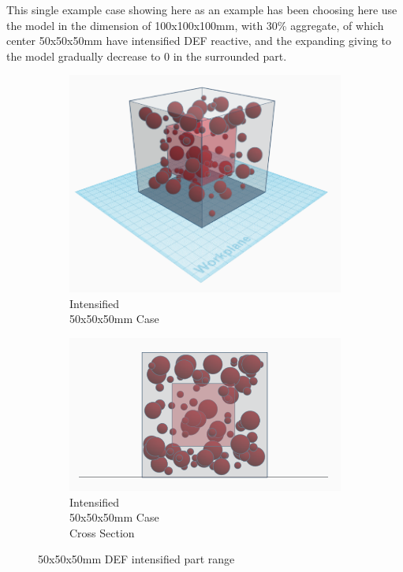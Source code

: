This single example case showing here as an example has been choosing here use the model in the dimension of 100x100x100mm, with 30\% aggregate, of which center 50x50x50mm have intensified DEF reactive, and the expanding giving to the model gradually decrease to 0 in the surrounded part.

\begin{figure}[ht]
\centering
    \begin{subfigure}{.33\textwidth}
      \centering
      \includegraphics[width=.8\linewidth]{Files/DEF_X/X0_3d.png}
      \caption{Intensified \\ 50x50x50mm Case}
    \end{subfigure}%

    \begin{subfigure}{.33\textwidth}
      \centering
      \includegraphics[width=.8\linewidth]{Files/DEF_X/X0_3ds.png}
      \caption{Intensified \\  50x50x50mm Case\\ Cross Section}
    \end{subfigure}%

  \caption{50x50x50mm DEF intensified part range}
  \label{fig:DEF_X0}
\end{figure}


